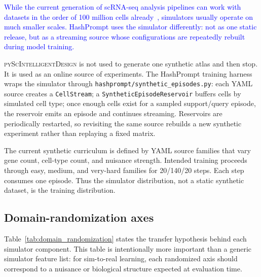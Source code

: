 \documentclass{article}
\newcommand{\phflo}[1]{\textcolor{blue}{#1}}
\begin{document}
\phflo{While the current generation of scRNA-seq analysis pipelines can work with datasets in the order of 100 million cells already~\cite{wolf2018scanpy, zhang2025tahoe}, simulators usually operate on much smaller scales. HashPrompt uses the simulator differently: not as one static release, but as a streaming source whose configurations are repeatedly rebuilt during model training.}

\textsc{pyScIntelligentDesign} is not used to generate one synthetic atlas and then stop. It is used as an online source of experiments. The HashPrompt training harness wraps the simulator through \texttt{hashprompt/synthetic\_episodes.py}: each YAML source creates a \texttt{CellStream}; a \texttt{SyntheticEpisodeReservoir} buffers cells by simulated cell type; once enough cells exist for a sampled support/query episode, the reservoir emits an episode and continues streaming. Reservoirs are periodically restarted, so revisiting the same source rebuilds a new synthetic experiment rather than replaying a fixed matrix.

The current synthetic curriculum is defined by YAML source families that vary gene count, cell-type count, and nuisance strength. Intended training proceeds through easy, medium, and very-hard families for 20/140/20 steps. Each step consumes one episode. Thus the simulator distribution, not a static synthetic dataset, is the training distribution.

\subsection{Domain-randomization axes}

Table~\ref{tab:domain_randomization} states the transfer hypothesis behind each simulator component. This table is intentionally more important than a generic simulator feature list: for sim-to-real learning, each randomized axis should correspond to a nuisance or biological structure expected at evaluation time.
\end{document}
